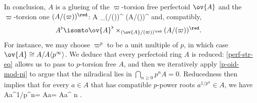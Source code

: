 In conclusion, $A$ is a glueing of the $\varpi$-torsion free perfectoid $\ov{A}$ and the $\varpi$-torsion one $(A/(\varpi))^\red$:
\be {}
A \isomto {} \times_{(/(\varpi))^\red} (A/(\varpi))^\red
\ee
and, compatibly,
\[
A^\flat \isomto \ov{A}^\flat \times_{(\ov{A}/(\varpi))^\red} (A/(\varpi))^\red.
\]
For instance, we may choose $\varpi^p$ to be a unit multiple of $p$, in which case $\ov{A} \cong A/A\langle p^\infty\rangle$. We deduce that every perfectoid ring $A$ is reduced: \eqref{perf-str-eq} allows us to pass to $p$-torsion free $A$, and then we iteratively apply \eqref{p-oid-mod-pi} to argue that the nilradical lies in $\bigcap_{n \ge 0} p^n A = 0$. Reducedness then implies that for every $a \in A$ that has compatible $p$-power roots $a^{1/p^n} \in A$, we have %
\be \label{no-big-tor}
A\langle a^{1/p^n}\rangle = A\langle a\rangle = A\langle a^\infty\rangle {} n .
\ee

\epp


